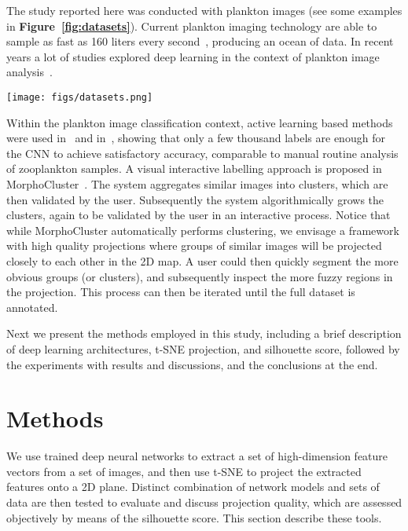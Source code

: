 \documentclass[sn-basic]{sn-jnl}%
\theoremstyle{thmstyleone}%
\theoremstyle{thmstyletwo}%
\theoremstyle{thmstylethree}%
\begin{document}
The study reported here was conducted with plankton images (see some examples in {\bf Figure~\ref{fig:datasets}}). Current plankton imaging technology are able to sample as fast as 160 liters every second~\citep{cowen-paper-isiis}, producing an ocean of data. In recent years a lot of studies explored deep learning in the context of plankton image analysis~\citep{luo-paper2018,dai-zooplanktonet,sms-lowshot,qi-lowshot,lumini-paper,orenstein-transferlearning}.

\begin{figure*}
\centerline{\texttt{[image: figs/datasets.png]}}
\caption{Samples from WHOI-ASLO (left / grey background) and Kaggle (right / white background) datasets.}
\label{fig:datasets}
\end{figure*}

Within the plankton image classification context, active learning based methods were used in~\citep{luo-paper-al} and in~\citep{bochinski-paper}, showing that only a few thousand labels are enough for the CNN to achieve satisfactory accuracy, comparable to manual routine analysis of zooplankton samples. A visual interactive labelling approach is proposed in MorphoCluster~\citep{morphocluster-paper}. The system aggregates similar images into clusters, which are then validated by the user. Subsequently the system algorithmically grows the clusters, again to be validated by the user in an interactive process. Notice that while MorphoCluster automatically performs clustering, we envisage a framework with high quality projections where groups of similar images will be projected closely to each other in the 2D map. A user could then quickly segment the more obvious groups (or clusters), and subsequently inspect the more fuzzy regions in the projection. This process can then be iterated until the full dataset is annotated.

Next we present the methods employed in this study, including a brief description of deep learning architectures, t-SNE projection, and silhouette score, followed by the experiments with results and discussions, and the conclusions at the end.


\section{Methods}

We use trained deep neural networks to extract a set of high-dimension feature vectors from a set of images, and then use t-SNE to project the extracted features onto a 2D plane. Distinct combination of network models and sets of data are then tested to evaluate and discuss projection quality, which are assessed objectively by means of the silhouette score. This section describe these tools.
\end{document}

